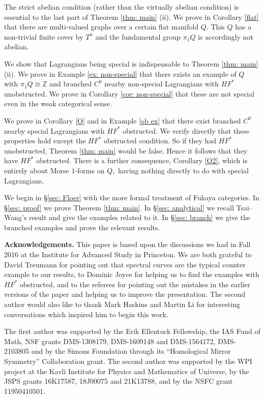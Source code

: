 \documentclass{article}
\theoremstyle{plain}%
\theoremstyle{definition}
\numberwithin{equation}{section}
\numberwithin{figure}{section}
\def\Z{{\mathbin{\mathbb Z}}}
\begin{document}
The strict abelian condition (rather than the virtually abelian condition) is essential to the last part of Theorem \ref{thm: main} (ii). We prove in Corollary \ref{flat} that there are multi-valued graphs over a certain flat manifold $Q.$ This $Q$ has a non-trivial finite cover by $T^n$ and the fundamental group $\pi_1Q$ is accordingly not abelian. 

We show that Lagrangians being special is indispensable to Theorem \ref{thm: main} (ii). We prove in Example \ref{ex: non-special} that there exists an example of $Q$ with $\pi_1Q\cong\Z$ and branched $C^0$ nearby non-special Lagrangians with $HF^*$ unobstructed. We prove in Corollary \ref{cor: non-special} that these are not special even in the weak categorical sense.

We prove in Corollary \ref{O} and in Example \ref{ob ex} that there exist branched $C^0$ nearby special Lagrangians with $HF^*$ obstructed. We verify directly that these properties hold except the $HF^*$ obstructed condition. So if they had $HF^*$ unobstructed, Theorem \ref{thm: main} would be false. Hence it follows that they have $HF^*$ obstructed. There is a further consequence, Corollary \ref{O2}, which is entirely about Morse $1$-forms on $Q,$ having nothing directly to do with special Lagrangians.

We begin in \S\ref{sec: Floer} with the more formal treatment of Fukaya categories. In \S\ref{sec: proof} we prove Theorem \ref{thm: main}. In \S\ref{sec: analytical} we recall Tsai--Wang's result and give the examples related to it. In \S\ref{sec: branch} we give the branched examples and prove the relevant results.

{\bf Acknowledgements.}
This paper is based upon the discussions we had in Fall 2016 at the Institute for Advanced Study in Princeton. We are both grateful to David Treumann for pointing out that spectral curves are the typical counter example to our results, to Dominic Joyce for helping us to find the examples with $HF^*$ obstructed, and to the referees for pointing out the mistakes in the earlier versions of the paper and helping us to improve the presentation. The second author would also like to thank Mark Haskins and Martin Li for interesting conversations which inspired him to begin this work.


The first author was supported by the Erik Ellentuck Fellowship, the IAS Fund of Math, NSF grants DMS-1308179,  DMS-1609148 and DMS-1564172, DMS-2103805 and by the Simons Foundation through its ``Homological Mirror Symmetry'' Collaboration grant.
The second author was supported by the WPI project at the Kavli Institute for Physics and Mathematics of Universe, by the JSPS grants 16K17587, 18J00075 and 21K13788, and by the NSFC grant 11950410501.
\end{document}
